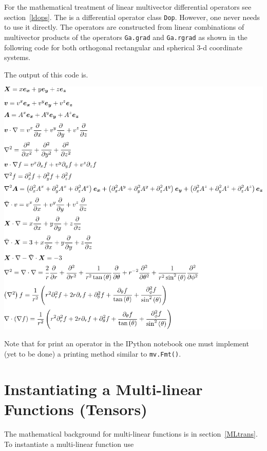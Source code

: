 \documentclass[12pt]{report}
\newcommand{\T}[1]{\texttt{#1}}
\newcommand{\includecode}[1]{}
\begin{document}
For the mathematical treatment of linear multivector differential operators see section~\ref{ldops}.  The is a differential operator
class \T{Dop}. However, one never needs to use it directly.  The operators are constructed from linear combinations of multivector
products of the operators \T{Ga.grad} and \T{Ga.rgrad} as shown in the following code for both orthogonal rectangular and spherical
3-d coordinate systems.
\includecode{python/Dop.py}
The output of this code is.
\begin{center}
    \includegraphics[scale=1]{python/Dop.pdf}
\end{center}

Note that for print an operator in the IPython notebook one must implement (yet to be done) a printing method similar to \T{mv.Fmt()}.

\section{Instantiating a Multi-linear Functions (Tensors)}

The mathematical background for multi-linear functions is in section~\ref{MLtrans}.  To instantiate a multi-linear function use
\end{document}
